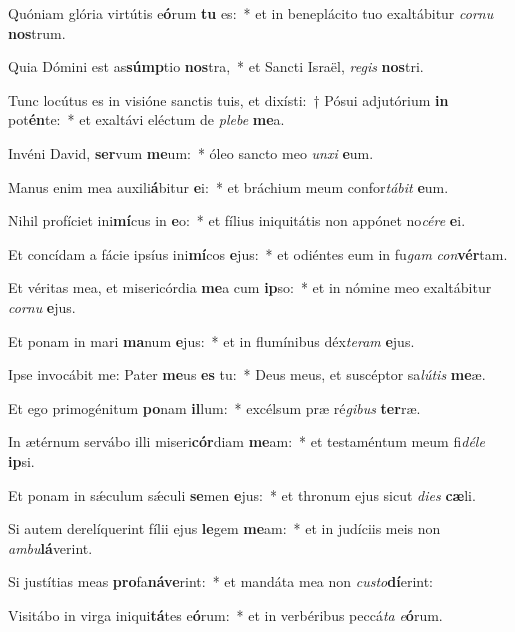 \item Quóniam glória virtútis e\textbf{ó}rum \textbf{tu} es:~* et in beneplácito tuo exaltábitur \textit{cor}\textit{nu} \textbf{nos}trum.
\item Quia Dómini est as\textbf{súmp}tio \textbf{nos}tra,~* et Sancti Israël, \textit{re}\textit{gis} \textbf{nos}tri.
\item Tunc locútus es in visióne sanctis tuis, et dixísti:~† Pósui adjutórium \textbf{in} pot\textbf{én}te:~* et exaltávi eléctum de \textit{ple}\textit{be} \textbf{me}a.
\item Invéni David, \textbf{ser}vum \textbf{me}um:~* óleo sancto meo \textit{un}\textit{xi} \textbf{e}um.
\item Manus enim mea auxili\textbf{á}bitur \textbf{e}i:~* et bráchium meum confor\textit{tá}\textit{bit} \textbf{e}um.
\item Nihil profíciet ini\textbf{mí}cus in \textbf{e}o:~* et fílius iniquitátis non appónet no\textit{cé}\textit{re} \textbf{e}i.
\item Et concídam a fácie ipsíus ini\textbf{mí}cos \textbf{e}jus:~* et odiéntes eum in fu\textit{gam} \textit{con}\textbf{vér}tam.
\item Et véritas mea, et misericórdia \textbf{me}a cum \textbf{ip}so:~* et in nómine meo exaltábitur \textit{cor}\textit{nu} \textbf{e}jus.
\item Et ponam in mari \textbf{ma}num \textbf{e}jus:~* et in flumínibus déx\textit{te}\textit{ram} \textbf{e}jus.
\item Ipse invocábit me: Pater \textbf{me}us \textbf{es} tu:~* Deus meus, et suscéptor sa\textit{lú}\textit{tis} \textbf{me}æ.
\item Et ego primogénitum \textbf{po}nam \textbf{il}lum:~* excélsum præ ré\textit{gi}\textit{bus} \textbf{ter}ræ.
\item In ætérnum servábo illi miseri\textbf{cór}diam \textbf{me}am:~* et testaméntum meum fi\textit{dé}\textit{le} \textbf{ip}si.
\item Et ponam in sǽculum sǽculi \textbf{se}men \textbf{e}jus:~* et thronum ejus sicut \textit{di}\textit{es} \textbf{cæ}li.
\item Si autem derelíquerint fílii ejus \textbf{le}gem \textbf{me}am:~* et in judíciis meis non \textit{am}\textit{bu}\textbf{lá}verint.
\item Si justítias meas \textbf{pro}fa\textbf{ná}\textbf{ve}rint:~* et mandáta mea non \textit{cus}\textit{to}\textbf{dí}erint:
\item Visitábo in virga iniqui\textbf{tá}tes e\textbf{ó}rum:~* et in verbéribus peccá\textit{ta} \textit{e}\textbf{ó}rum.
